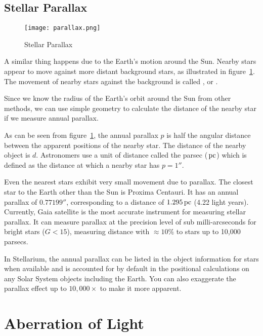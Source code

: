 \subsection{Stellar Parallax}
\label{sec:Concepts:StellarParallax}

\begin{figure}[tb]
\centering\texttt{[image: parallax.png]}
\caption{Stellar Parallax}
\label{fig:Parallax}
\end{figure}

A similar thing happens due to the Earth's motion around the Sun. Nearby
stars appear to move against more distant background stars, as
illustrated in figure~\ref{fig:Parallax}.
The movement of nearby stars against the background is called
, or .

Since we know the radius of the Earth's orbit around the
Sun from other methods, we can use simple geometry to calculate the
distance of the nearby star if we measure annual parallax.

As can be seen from figure~\ref{fig:Parallax}, the annual
parallax $p$ is half the angular distance between the apparent positions
of the nearby star. The distance of the nearby object is $d$. Astronomers
use a unit of distance called the parsec ($\pc$) which is defined as the
distance at which a nearby star has $p=1''$.

Even the nearest stars exhibit very small movement due to
parallax. The closest star to the Earth other than the Sun is Proxima
Centauri. It has an annual parallax of $0.77199''$, corresponding to a
distance of $1.295\pc$ (4.22 light years). Currently, Gaia satellite is the most
accurate instrument for measuring stellar parallax. It can measure parallax
at the precision level of sub milli-arcseconds for bright stars ($G<15$), measuring distance
with $\approx 10\%$ to stars up to 10,000 parsecs.

In Stellarium, the annual parallax can be listed in the object information for stars
when available and is accounted for by default in the positional calculations on any 
Solar System objects including the Earth. You can also exaggerate the parallax effect up to $10,000\times$ 
to make it more apparent.

\section{Aberration of Light}
\label{sec:Concepts:Aberration}

